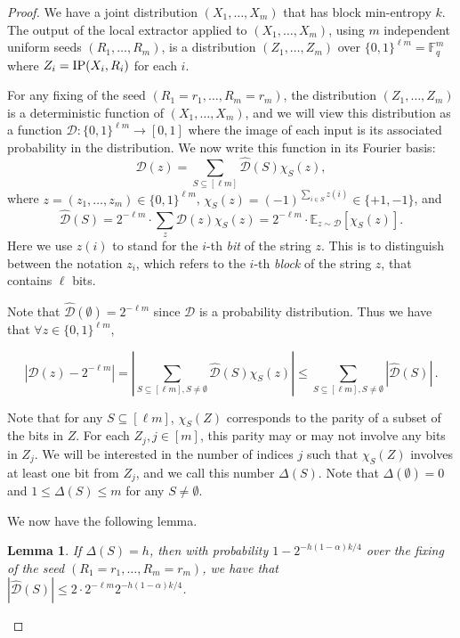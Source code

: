\documentclass[11pt]{article}
\numberwithin{equation}{section}
\newtheorem{lemma}[theorem]{Lemma}
\theoremstyle{definition}
\theoremstyle{plain}
\def\E{\mathbb{E}}
\newcommand{\IP}{\textnormal{IP}}
\newcommand{\F}{\mathbb{F}}
\newcommand{\calD}{\mathcal{D}} %
\begin{document}
\begin{proof}
We have a joint distribution $(X_1, \ldots, X_m)$ that has
block min-entropy $k$. The output of the local extractor applied to $(X_1, \ldots, X_m)$, using $m$ independent uniform seeds $(R_1, \ldots, R_m)$,
is a distribution $(Z_1, \ldots, Z_m)$ over $\{0, 1\}^{\ell m}=\F_q^m$ where $Z_i=\IP(X_i, R_i)$ for each $i$.

For any fixing of the seed $(R_1=r_1, \ldots, R_m=r_m)$, the distribution $(Z_1, \ldots, Z_m)$ is a deterministic function of $(X_1, \ldots, X_m)$,
and we will view this distribution as a function ${\calD}: \{0, 1\}^{\ell m} \to [0, 1]$ where the image of each input is its associated probability
in the distribution. We now write this function in its Fourier basis:
\[{\calD}(z)=\sum_{S \subseteq [\ell m]} \hat{{\calD}}(S) \chi_S(z),\]
where $z=(z_1, \ldots, z_m) \in \{0, 1\}^{\ell m}$, $\chi_S(z)=(-1)^{\sum_{i \in S} z(i)} \in \{+1, -1\}$, and
\[ \hat{{\calD}}(S)=2^{-\ell m}\cdot \sum_z {\calD}(z) \chi_S(z)=2^{-\ell m} \cdot\E_{z \sim {\calD}} [\chi_S(z)]. \]
Here we use $z(i)$ to stand for the $i$-th \emph{bit} of the string $z$. This is to distinguish between the notation $z_i$, which
refers 
%
to the $i$-th \emph{block} of the string $z$, that contains $\ell$ bits.

Note that $\hat{{\calD}}(\emptyset)=2^{-\ell m}$ since ${\calD}$ is a probability distribution. Thus we have that $\forall z \in \{0, 1\}^{\ell m}$,

\begin{equation}
\left |{\calD}(z)-2^{-\ell m} \right | =\left |\sum_{S \subseteq [\ell m], S \neq \emptyset} \hat{{\calD}}(S) \chi_S(z) \right | \leq \sum_{S
\subseteq [\ell m], S \neq \emptyset} \left |\hat{{\calD}}(S) \right |\,.
\end{equation}
  
Note that for any $S \subseteq [\ell m]$, $\chi_S(Z)$ corresponds to the parity of a subset of the bits in $Z$. For each $Z_j, j \in [m]$, this
parity may or may not involve any bits in $Z_j$. We will be interested in the number of %
indices $j$  %
such that $\chi_S(Z)$ involves at least one bit from
$Z_j$, and we call this number $\Delta(S)$. Note that $\Delta(\emptyset)=0$ and $1 \leq \Delta(S) \leq m$ for any $S \neq \emptyset$.

We now have the following lemma.

\begin{lemma}
If $\Delta(S)=h$, then with probability 
%
$1-2^{-h(1-\alpha)k/4}$   %
over the fixing of the seed $(R_1=r_1, \ldots, R_m=r_m)$, we
have that 
%
$|\hat{\calD}(S) | \leq 2 \cdot 2^{-\ell m}2^{-h(1-\alpha)k/4}$.
\end{lemma}


\end{proof}
\end{document}
